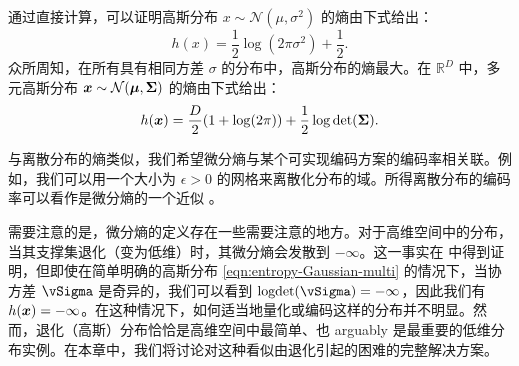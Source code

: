 \documentclass[../../book-main.tex]{subfiles}
\begin{document}
\begin{example}[高斯分布的熵]
	通过直接计算，可以证明高斯分布 $x \sim \mathcal{N}(\mu, \sigma^2)$ 的熵由下式给出：
	\begin{equation}
		h(x) = \frac{1}{2}\log (2\pi \sigma^2) + \frac{1}{2}.
		\label{eqn:entropy-Gaussian}
	\end{equation}
	众所周知，在所有具有相同方差 $\sigma$ 的分布中，高斯分布的熵最大。在 $\mathbb{R}^D$ 中，多元高斯分布 $\bm{x} \sim \mathcal{N}(\boldsymbol{\mu}, \boldsymbol{\Sigma})$ 的熵由下式给出：
	\begin{equation}
		h(\bm{x}) = \frac{D}{2}(1 + \log(2\pi)) + \frac{1}{2}\log\det(\boldsymbol{\Sigma}).
		\label{eqn:entropy-Gaussian-multi}
	\end{equation}
\end{example}

与离散分布的熵类似，我们希望微分熵与某个可实现编码方案的编码率相关联。例如，我们可以用一个大小为 $\epsilon >0$ 的网格来离散化分布的域。所得离散分布的编码率可以看作是微分熵的一个近似 \cite{Cover-Thomas}。


需要注意的是，微分熵的定义存在一些需要注意的地方。对于高维空间中的分布，当其支撑集退化（变为低维）时，其微分熵会发散到 \(-\infty\)。这一事实在  中得到证明，但即使在简单明确的高斯分布 \eqref{eqn:entropy-Gaussian-multi} 的情况下，当协方差 \(\vSigma\) 是奇异的，我们可以看到 \(\logdet(\vSigma) = -\infty\)，因此我们有 $h(\bm{x}) = -\infty$。在这种情况下，如何适当地量化或编码这样的分布并不明显。然而，退化（高斯）分布恰恰是高维空间中最简单、也 arguably 是最重要的低维分布实例。在本章中，我们将讨论对这种看似由退化引起的困难的完整解决方案。


\end{document}
